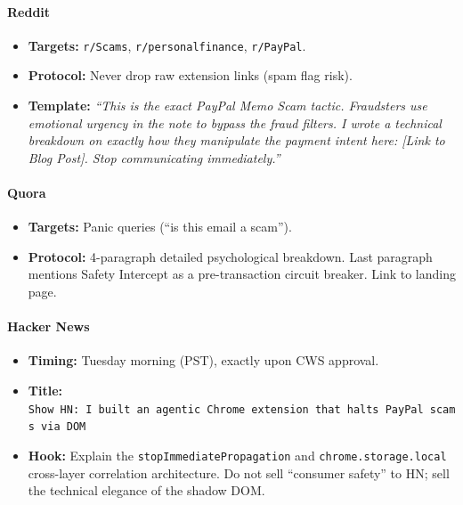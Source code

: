 \documentclass[
]{article}
\providecommand{\tightlist}{%
  \setlength{\itemsep}{0pt}\setlength{\parskip}{0pt}}
\begin{document}
\paragraph{Reddit}\label{reddit}

\begin{itemize}
\tightlist
\item
  \textbf{Targets:} \texttt{r/Scams}, \texttt{r/personalfinance},
  \texttt{r/PayPal}.
\item
  \textbf{Protocol:} Never drop raw extension links (spam flag risk).
\item
  \textbf{Template:} \emph{``This is the exact PayPal Memo Scam tactic.
  Fraudsters use emotional urgency in the note to bypass the fraud
  filters. I wrote a technical breakdown on exactly how they manipulate
  the payment intent here: {[}Link to Blog Post{]}. Stop communicating
  immediately.''}
\end{itemize}

\paragraph{Quora}\label{quora}

\begin{itemize}
\tightlist
\item
  \textbf{Targets:} Panic queries (``is this email a scam'').
\item
  \textbf{Protocol:} 4-paragraph detailed psychological breakdown. Last
  paragraph mentions Safety Intercept as a pre-transaction circuit
  breaker. Link to landing page.
\end{itemize}

\paragraph{Hacker News}\label{hacker-news}

\begin{itemize}
\tightlist
\item
  \textbf{Timing:} Tuesday morning (PST), exactly upon CWS approval.
\item
  \textbf{Title:}
  \texttt{Show\ HN:\ I\ built\ an\ agentic\ Chrome\ extension\ that\ halts\ PayPal\ scams\ via\ DOM}
\item
  \textbf{Hook:} Explain the \texttt{stopImmediatePropagation} and
  \texttt{chrome.storage.local} cross-layer correlation architecture. Do
  not sell ``consumer safety'' to HN; sell the technical elegance of the
  shadow DOM.
\end{itemize}
\end{document}
